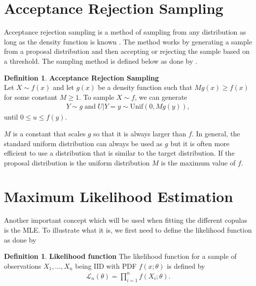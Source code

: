 \documentclass[%
a4paper,							
11pt,								
bibliography=totoc,						
abstracton=true					
]
{scrartcl}
\theoremstyle{plain}
\theoremstyle{definition}
\newtheorem{definition}[theorem]{Definition}
\theoremstyle{remark}
\newcommand{\1}{\mathbbm{1}}
\begin{document}
\section{Acceptance Rejection Sampling}\label{sec:AcceptanceRejection}
Acceptance rejection sampling is a method of sampling from any distribution as long as the density function is known . The method works by generating a sample from a proposal distribution and then accepting or rejecting the sample based on a threshold. The sampling method is defined below as done by .

\begin{definition}
    \textbf{Acceptance Rejection Sampling}\\
    Let $X \sim f(x)$ and let $g(x)$ be a density function such that $M g(x) \geq f(x)$ for some constant $M \geq 1$. To sample $X \sim f$, we can generate
    \begin{align*}
        Y \sim g \; \mathrm{and} \; U|Y = y \sim \mathrm{Unif}(0,Mg(y)),      
    \end{align*}
    until $0 \leq u \leq f(y)$.
\end{definition}
$M$ is a constant that scales $g$ so that it is always larger than $f$. In general, the standard uniform distribution can always be used as $g$ but it is often more efficient to use a distribution that is similar to the target distribution. If the proposal distribution is the uniform distribution $M$ is the maximum value of $f$.  




\section{Maximum Likelihood Estimation}\label{sec:MLE}
Another important concept which will be used when fitting the different copulas is the \gls{MLE}. To illustrate what it is, we first need to define the likelihood function as done by 
\begin{definition}
    \textbf{Likelihood function}
    The likelihood function for a sample of observations $X_1,\dots,X_n$ being $\mathrm{IID}$ with \gls{PDF} $f(x;\theta)$ is defined by 
    \begin{align*}
        \mathcal{L}_n(\theta) = \prod_{i=1}^n f(X_i;\theta).
    \end{align*}
\end{definition}
\end{document}
